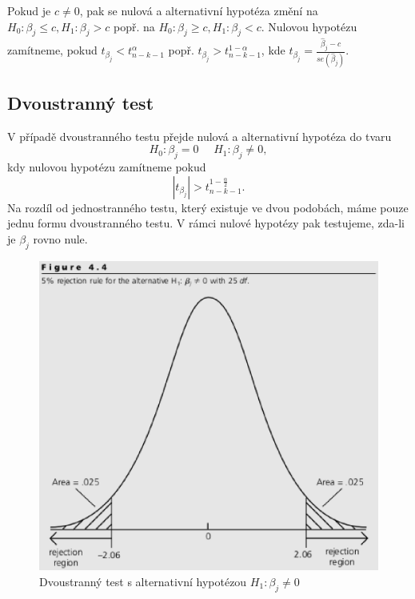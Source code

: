 Pokud je $c \ne 0$, pak se nulová a alternativní hypotéza změní na $H_0: \beta_j \le c, H_1: \beta_j > c$ popř. na $H_0: \beta_j \ge c, H_1: \beta_j < c$. Nulovou hypotézu zamítneme, pokud $t_{\beta_j} < t_{n-k-1}^{\alpha}$ popř. $t_{\beta_j} > t_{n-k-1}^{1 - \alpha}$, kde $t_{\beta_j} = \frac{\hat{\beta}_j - c}{se(\hat{\beta}_j)}$.

\subsection{Dvoustranný test}

V případě dvoustranného testu přejde nulová a alternativní hypotéza do tvaru
\begin{equation}
H_0: \beta_j = 0 ~~~~~~ H_1: \beta_j \ne 0,
\end{equation}
kdy nulovou hypotézu zamítneme pokud
\begin{equation}
|t_{\beta_j}| > t_{n-k-1}^{1 - \frac{\alpha}{2}}.
\end{equation}
Na rozdíl od jednostranného testu, který existuje ve dvou podobách, máme pouze jednu formu dvoustranného testu. V rámci nulové hypotézy pak testujeme, zda-li je $\beta_j$ rovno nule.

\begin{figure}[htp]
\centering
\includegraphics[scale = 0.5]{pictures/figure_4_4.eps}
\caption{Dvoustranný test s alternativní hypotézou $H_1: \beta_j \ne 0$}
\label{figure_4_4}
\end{figure} 

